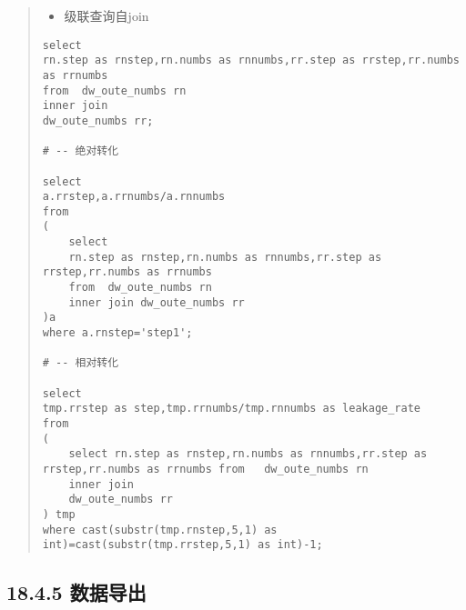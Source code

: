 \begin{quote}
\begin{itemize}
\item
  级联查询自join
\end{itemize}

\begin{verbatim}
select 
rn.step as rnstep,rn.numbs as rnnumbs,rr.step as rrstep,rr.numbs as rrnumbs  
from  dw_oute_numbs rn
inner join 
dw_oute_numbs rr;

# -- 绝对转化

select 
a.rrstep,a.rrnumbs/a.rnnumbs
from 
(
    select 
    rn.step as rnstep,rn.numbs as rnnumbs,rr.step as rrstep,rr.numbs as rrnumbs  
    from  dw_oute_numbs rn
    inner join dw_oute_numbs rr
)a
where a.rnstep='step1';

# -- 相对转化

select 
tmp.rrstep as step,tmp.rrnumbs/tmp.rnnumbs as leakage_rate
from
(
    select rn.step as rnstep,rn.numbs as rnnumbs,rr.step as rrstep,rr.numbs as rrnumbs from   dw_oute_numbs rn
    inner join 
    dw_oute_numbs rr
) tmp
where cast(substr(tmp.rnstep,5,1) as int)=cast(substr(tmp.rrstep,5,1) as int)-1;
\end{verbatim}
\end{quote}

\subsection{18.4.5 数据导出}\label{ux6570ux636eux5bfcux51fa}

